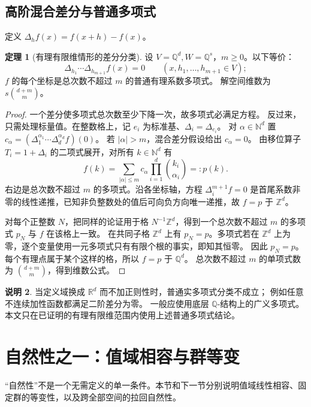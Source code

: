 \documentclass[UTF8,11pt,a4paper]{ctexart}
\theoremstyle{definition}
\newtheorem{theorem}{定理}[section]
\newtheorem{remark}[theorem]{说明}
\newcommand{\Q}{\mathbb Q}
\newcommand{\R}{\mathbb R}
\newcommand{\Z}{\mathbb Z}
\newcommand{\N}{\mathbb N}
\numberwithin{equation}{section}
\begin{document}
\subsection{高阶混合差分与普通多项式}
定义 $\Delta_hf(x)=f(x+h)-f(x)$。
\begin{theorem}[有理有限维情形的差分分类]\label{thm:polydifference}
设 $V=\Q^d,W=\Q^s$，$m\ge0$。以下等价：
\[
 \Delta_{h_1}\cdots\Delta_{h_{m+1}}f(x)=0
 \qquad(x,h_1,\ldots,h_{m+1}\in V);
\]
$f$ 的每个坐标是总次数不超过 $m$ 的普通有理系数多项式。
解空间维数为 $s\binom{d+m}{m}$。
\end{theorem}
\begin{proof}
一个差分使多项式总次数至少下降一次，故多项式必满足方程。
反过来，只需处理标量值。在整数格上，记 $e_i$ 为标准基、$\Delta_i=\Delta_{e_i}$。
对 $\alpha\in\N^d$ 置 $c_\alpha=(\Delta_1^{\alpha_1}\cdots\Delta_d^{\alpha_d}f)(0)$。
若 $|\alpha|>m$，混合差分假设给出 $c_\alpha=0$。
由移位算子 $T_i=1+\Delta_i$ 的二项式展开，对所有 $k\in\N^d$ 有
\[
 f(k)=\sum_{|\alpha|\le m}c_\alpha
       \prod_{i=1}^d\binom{k_i}{\alpha_i}=:p(k).
\]
右边是总次数不超过 $m$ 的多项式。沿各坐标轴，方程 $\Delta_i^{m+1}f=0$ 是首尾系数非零的线性递推，已知非负整数处的值后可向负方向唯一递推，故 $f=p$ 于 $\Z^d$。

对每个正整数 $N$，把同样的论证用于格 $N^{-1}\Z^d$，得到一个总次数不超过 $m$ 的多项式 $p_N$ 与 $f$ 在该格上一致。
在共同子格 $\Z^d$ 上有 $p_N=p$。多项式若在 $\Z^d$ 上为零，逐个变量使用一元多项式只有有限个根的事实，即知其恒零。
因此 $p_N=p$。每个有理点属于某个这样的格，所以 $f=p$ 于 $\Q^d$。
总次数不超过 $m$ 的单项式数为 $\binom{d+m}{m}$，得到维数公式。
\end{proof}
\begin{remark}
当定义域换成 $\R^d$ 而不加正则性时，普通实多项式分类不成立；
例如任意不连续加性函数都满足二阶差分为零。
一般应使用底层 $\Q$-结构上的广义多项式。本文只在已证明的有理有限维范围内使用上述普通多项式结论。
\end{remark}

\section{自然性之一：值域相容与群等变}\label{sec:natural}
“自然性”不是一个无需定义的单一条件。本节和下一节分别说明值域线性相容、固定群的等变性，以及跨全部空间的拉回自然性。
\end{document}
